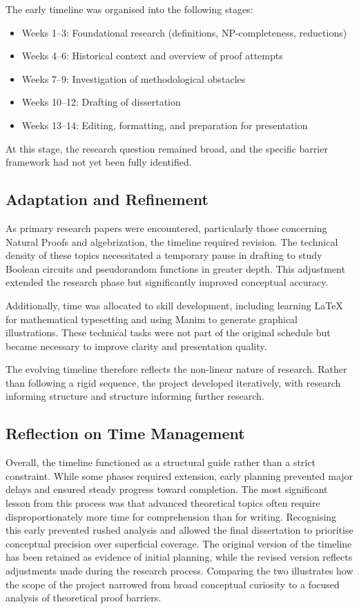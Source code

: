 \documentclass[12pt]{article}
\begin{document}
The early timeline was organised into the following stages:

\begin{itemize}
    \item Weeks 1--3: Foundational research (definitions, NP-completeness, reductions)
    \item Weeks 4--6: Historical context and overview of proof attempts
    \item Weeks 7--9: Investigation of methodological obstacles
    \item Weeks 10--12: Drafting of dissertation
    \item Weeks 13--14: Editing, formatting, and preparation for presentation
\end{itemize}

At this stage, the research question remained broad, and the specific barrier framework had not yet been fully identified.

\subsection*{Adaptation and Refinement}

As primary research papers were encountered, particularly those concerning Natural Proofs and algebrization, the timeline required revision.
The technical density of these topics necessitated a temporary pause in drafting to study Boolean circuits and pseudorandom functions in greater depth.
This adjustment extended the research phase but significantly improved conceptual accuracy.

Additionally, time was allocated to skill development, including learning \LaTeX{} for mathematical typesetting and using Manim to generate graphical illustrations.
These technical tasks were not part of the original schedule but became necessary to improve clarity and presentation quality.

The evolving timeline therefore reflects the non-linear nature of research. Rather than following a rigid sequence, the project developed iteratively, with research informing structure and structure informing further research.

\subsection*{Reflection on Time Management}

Overall, the timeline functioned as a structural guide rather than a strict constraint. While some phases required extension, early planning prevented major delays and ensured steady progress toward completion. The most significant lesson from this process was that advanced theoretical topics often require disproportionately more time for comprehension than for writing. Recognising this early prevented rushed analysis and allowed the final dissertation to prioritise conceptual precision over superficial coverage.
The original version of the timeline has been retained as evidence of initial planning, while the revised version reflects adjustments made during the research process.
Comparing the two illustrates how the scope of the project narrowed from broad conceptual curiosity to a focused analysis of theoretical proof barriers.
\end{document}
